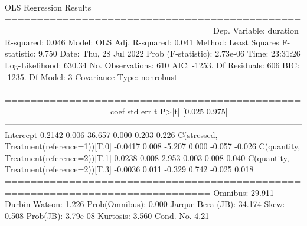    OLS Regression Results  \\                          
==============================================================================
Dep. Variable:               duration   R-squared:                       0.046
Model:                            OLS   Adj. R-squared:                  0.041
Method:                 Least Squares   F-statistic:                     9.750
Date:                Thu, 28 Jul 2022   Prob (F-statistic):           2.73e-06
Time:                        23:31:26   Log-Likelihood:                 630.34
No. Observations:                 610   AIC:                            -1253.
Df Residuals:                     606   BIC:                            -1235.
Df Model:                           3                                         
Covariance Type:            nonrobust                                         
============================================================================================================
                                               coef    std err          t      P>|t|      [0.025      0.975]
------------------------------------------------------------------------------------------------------------
Intercept                                    0.2142      0.006     36.657      0.000       0.203       0.226
C(stressed, Treatment(reference=1))[T.0]    -0.0417      0.008     -5.207      0.000      -0.057      -0.026
C(quantity, Treatment(reference=2))[T.1]     0.0238      0.008      2.953      0.003       0.008       0.040
C(quantity, Treatment(reference=2))[T.3]    -0.0036      0.011     -0.329      0.742      -0.025       0.018
==============================================================================
Omnibus:                       29.911   Durbin-Watson:                   1.226
Prob(Omnibus):                  0.000   Jarque-Bera (JB):               34.174
Skew:                           0.508   Prob(JB):                     3.79e-08
Kurtosis:                       3.560   Cond. No.                         4.21